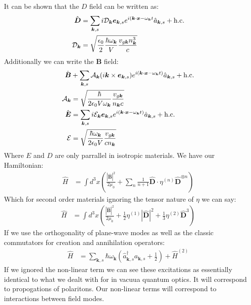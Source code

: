 It can be shown that the $D$ field can be written as:
\begin{align*}
	\hat{\bm{D}} &= \sum_{\bm{k},s} i\mathcal{D}_{\bm{k}} \bm{e}_{\bm{k},s} e^{i(\bm{k}\cdot\bm{x} - \omega_{\bm{k}} t} \hat{a}_{\bm{k},s} + \text{h.c.} \\
	\mathcal{D}_{\bm{k}} &= \sqrt{\frac{\epsilon_0}{2} \frac{\hbar\omega_{\bm{k}}}{V} \frac{v_{g\bm{k}}n_{\bm{k}}^3}{c}}
\end{align*}
Additionally we can write the $\bm{B}$ field:
\begin{align*}
	\hat{\bm{B}} &+ \sum_{\bm{k},s} \mathcal{A}_{\bm{k}} (i\bm{k}\times\bm{e}_{\bm{k},s}) e^{i(\bm{k}\cdot\bm{x} - \omega_{\bm{k}}t)} \hat{a}_{\bm{k},s} + \text{h.c.} \\
	\mathcal{A}_{\bm{k}} &= \sqrt{\frac{\hbar}{2\epsilon_0V\omega_{\bm{k}}} \frac{v_{g\bm{k}}}{n_{\bm{k}} c}} \\
	\hat{\bm{E}} &= \sum_{\bm{k},s} i\mathcal{E}_{\bm{k}} \bm{e}_{\bm{k},s} e^{i(\bm{k}\cdot\bm{x} - \omega_{\bm{k}}t)} \hat{a}_{\bm{k},s} + \text{h.c.} \\
	\mathcal{E} &= \sqrt{\frac{\hbar\omega_{\bm{k}}}{2\epsilon_0 V}\frac{v_{g\bm{k}}}{cn_{\bm{k}}}}
\end{align*}
Where $E$ and $D$ are only parrallel in isotropic materials. We have our Hamiltonian:
\begin{align*}
	\hat{H} &= \int d^3 x \left(\frac{|\hat{\bm{B}}|^2}{2\mu_0} + \sum_n \frac{1}{n+1} \hat{\bm{D}}\cdot\eta^{(n)}\hat{\bm{D}}^{\otimes n}\right)
\end{align*}
Which for second order materials ignoring the tensor nature of $\eta$ we can say:
\begin{align*}
	\hat{H} &= \int d^3 x \left(\frac{|\hat{\bm{B}}|^2}{2\mu_0} + \frac{1}{2} \eta^{(1)}|\hat{\bm{D}}|^2 + \frac{1}{3} \eta^{(2)} \hat{\bm{D}}^3\right)
\end{align*}
If we use the orthogonality of plane-wave modes as well as the classic commutators for creation and annihilation operators:
\begin{align*}
	\hat{H} &= \sum_{\bm{k},s} \hbar\omega_{\bm{k}} \left(\hat{a}_{\bm{k},s}^\dagger\hat{a}_{\bm{k},s} + \frac{1}{2}\right) + \hat{H}^{(2)}
\end{align*}
If we ignored the non-linear term we can see these excitations as essentially identical to what we dealt with for in vacuua quantum optics. It will correspond to propogations of polaritons.
Our non-linear terms will correspond to interactions between field modes.

